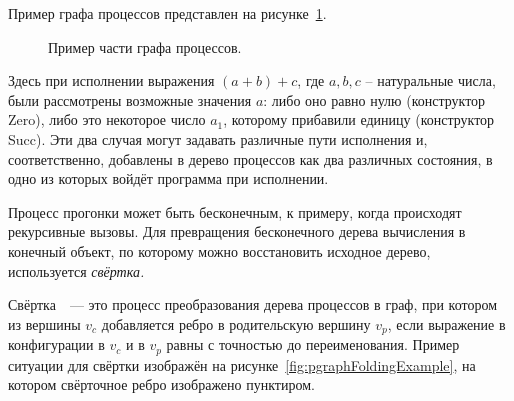Пример графа процессов представлен на рисунке~\ref{fig:pgraphExample}.
\begin{figure}[h!]
\center
{}

\caption{Пример части графа процессов.}
\label{fig:pgraphExample}
\end{figure}
Здесь при исполнении выражения $(a + b) + c$, где $a, b, c$ -- натуральные числа,
были рассмотрены возможные значения $a$: либо оно равно нулю (конструктор Zero), либо это некоторое
число $a_1$, которому прибавили единицу (конструктор Succ). Эти два случая могут задавать
различные пути исполнения и, соответственно, добавлены в дерево процессов как два различных состояния,
в одно из которых войдёт программа при исполнении.

Процесс прогонки может быть бесконечным, к примеру, когда происходят рекурсивные вызовы.
Для превращения бесконечного дерева вычисления в конечный объект, по которому можно
восстановить исходное дерево, используется \emph{свёртка.}

Свёртка~~--- это процесс преобразования дерева процессов в граф, при котором
из вершины $v_c$ добавляется ребро в родительскую вершину $v_p$,
если выражение в конфигурации в $v_c$ и в $v_p$ равны с точностью до переименования.
Пример ситуации для свёртки изображён на рисунке~\ref{fig:pgraphFoldingExample},
на котором свёрточное ребро изображено пунктиром.

